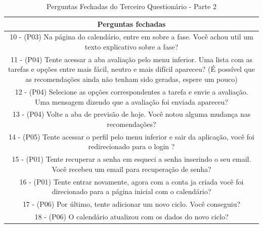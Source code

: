 \begin{table}[ht]
    \centering
    \caption{Perguntas Fechadas do Terceiro Questionário - Parte 2}
    \label{tab17}
    \begin{tabular}{c}
        \toprule
        \textbf{Perguntas fechadas} \\
        \midrule
        \begin{minipage} [t] {1\textwidth} 10 - (P03) Na página do calendário, entre em sobre a fase. Você achou util um texto explicativo sobre a fase? \end{minipage}\\
        \midrule
        \begin{minipage} [t] {1\textwidth} 11 - (P04) Tente acessar a aba avaliação pelo menu inferior. Uma lista com as tarefas e opções entre mais fácil, neutro e mais difícil apareceu? (É possível que as recomendações ainda não tenham sido geradas, espere um pouco) \end{minipage}\\
        \midrule
        \begin{minipage} [t] {1\textwidth} 12 - (P04) Selecione as opções correspondentes a tarefa e envie a avaliação. Uma mensagem dizendo que a avaliação foi enviada apareceu? \end{minipage}\\
        \midrule
        \begin{minipage} [t] {1\textwidth} 13 - (P04) Volte a aba de previsão de hoje. Você notou alguma mudança nas recomendações? \end{minipage}\\
        \midrule
        \begin{minipage} [t] {1\textwidth} 14 - (P05) Tente acessar o perfil pelo menu inferior e sair da aplicação, você foi redirecionado para o login ? \end{minipage}\\
        \midrule
        \begin{minipage} [t] {1\textwidth} 15 - (P01) Tente recuperar a senha em esqueci a senha inserindo o seu email. Você recebeu um email para recuperação de senha? \end{minipage}\\
        \midrule
        \begin{minipage} [t] {1\textwidth} 16 - (P01) Tente entrar novamente, agora com a conta ja criada você foi direcionado para a página inicial com o calendário? \end{minipage}\\
        \midrule
        \begin{minipage} [t] {1\textwidth} 17 - (P06) Por último, tente adicionar um novo ciclo. Você conseguiu? \end{minipage}\\
        \midrule
        \begin{minipage} [t] {1\textwidth} 18 - (P06) O calendário atualizou com os dados do novo ciclo? \end{minipage}\\
        \bottomrule
    \end{tabular}
\end{table}

